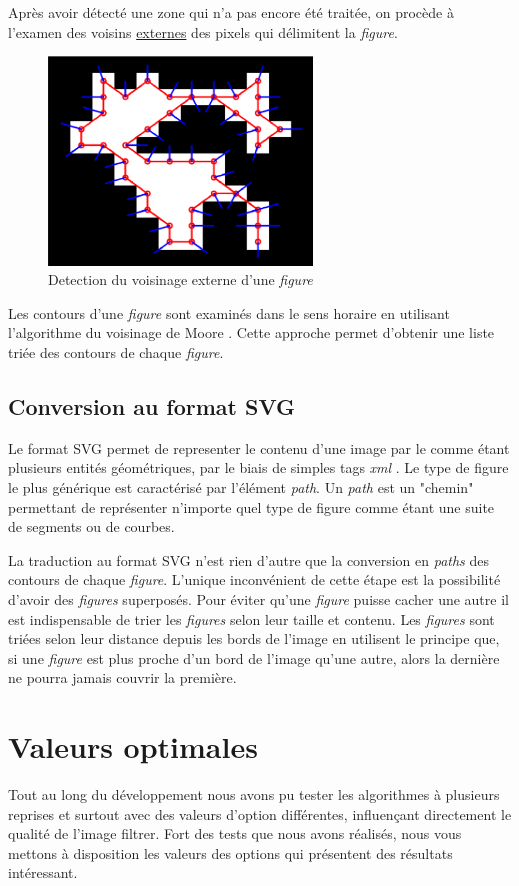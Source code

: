 \documentclass[twoside,openright,a4paper,11pt,french]{article}
\begin{document}
Après avoir détecté une zone qui n'a pas encore été traitée, on procède
à l'examen des voisins \underline{externes} des pixels qui délimitent
la {\it figure}.

\begin{figure}[h]
\centering
\includegraphics[width=7cm]{./pics/moore.eps}
\caption{Detection du voisinage externe d'une {\it figure}}
\label{fig:moore}
\end{figure}

Les contours d'une {\it figure} sont examinés dans le sens horaire en
utilisant l'algorithme du voisinage de Moore \cite{url-moore}. Cette
approche permet d'obtenir une liste triée des contours de chaque {\it
figure}.


\subsection{Conversion au format SVG}
Le format SVG permet de representer le contenu d'une image par le
comme étant plusieurs entités géométriques, par le biais de simples tags
{\it xml} \cite{url-svg}. Le type de figure le plus générique est
caractérisé par l'élément {\it path}. Un {\it path} est un "chemin"
permettant  de représenter n'importe quel type de figure comme étant
une suite de segments ou de courbes.

La traduction au format SVG n'est rien d'autre que la conversion en
{\it paths} des contours de chaque {\it figure}. L'unique inconvénient
de cette étape est la possibilité d'avoir des {\it
figures} superposés.  Pour éviter qu'une {\it figure} puisse cacher
une autre il est indispensable de trier les {\it figures} selon leur
taille et contenu. Les {\it figures} sont triées selon leur distance 
depuis les bords de l'image en utilisent le principe que, si une
{\it figure } est plus proche d'un bord de l'image qu'une autre,
alors la dernière ne pourra jamais couvrir la première.


\section{Valeurs optimales}
Tout au long du développement nous avons pu tester les algorithmes à
plusieurs reprises et surtout avec des valeurs d'option différentes,
influençant directement le qualité de l'image filtrer.
Fort des tests que nous avons réalisés, nous vous mettons à disposition
les valeurs des options qui présentent des résultats intéressant.
\end{document}

